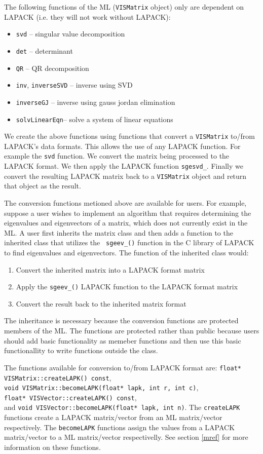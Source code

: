 The following functions of the ML ({\tt VISMatrix} object)
only are dependent on LAPACK
(i.e. they will not work without LAPACK):
\begin{itemize}
\item{{\tt svd} -- singular value decomposition}
\item{{\tt det} -- determinant}
\item{{\tt QR} -- QR decomposition}
\item{{\tt inv}, {\tt inverseSVD} -- inverse using SVD}
\item{{\tt inverseGJ} -- inverse using gauss jordan elimination}
\item{{\tt solvLinearEqn}-- solve a system of linear equations}
\end{itemize}

We create the above functions using
functions that convert a {\tt VISMatrix} to/from LAPACK's data formats.
This allows the use of any LAPACK function.
For example the {\tt svd} function.
We convert the matrix being processed to the LAPACK format.
We then apply the LAPACK function {\tt sgesvd\_}.
Finally we convert the resulting LAPACK matrix back to a {\tt VISMatrix}
object and return that object as the result.

The conversion functions metioned above are available for users.  For 
example, suppose a user wishes to implement an algorithm that requires 
determining the eigenvalues and eigenvectors of a matrix, which does 
not currently exist in the ML.  A user first inherits the matrix class 
and then adds a function to the inherited class that utilizes the {\tt 
sgeev\_()} function in the C library of LAPACK to find eigenvalues and 
eigenvectors.  The function of the inherited class would:
\begin{enumerate}
\item{Convert the inherited matrix into a LAPACK format matrix}
\item{Apply the {\tt sgeev\_()} LAPACK function to the LAPACK format matrix}
\item{Convert the result back to the inherited matrix format}
\end{enumerate}

The inheritance is necessary because the conversion functions are 
protected members of the ML.  The functions are protected rather than 
public because users should add basic functionality as memeber 
functions and then use this basic functionallity to write functions 
outside the class.

The functions available for conversion to/from LAPACK format are:
{\tt float* VISMatrix::createLAPK() const},\\
{\tt void VISMatrix::becomeLAPK(float* lapk, int r, int c)},\\
{\tt float* VISVector::createLAPK() const},\\ and
{\tt void VISVector::becomeLAPK(float* lapk, int n)}.
The {\tt createLAPK} functions create a LAPACK matrix/vector
from an ML matrix/vector respectively.
The {\tt becomeLAPK} functions assign the values from a LAPACK
matrix/vector to a ML matrix/vector respectivelly.
See section \ref{mref} for more information on these functions.


